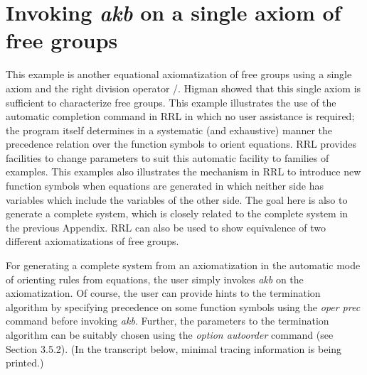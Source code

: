\chapter{Invoking {\em akb} on a single axiom of free groups}
\normalsize
\rm
This example is another equational axiomatization of free groups
using a single axiom and the right division
operator /. Higman showed that this single axiom is
sufficient to characterize free groups. This example illustrates
the use of the automatic completion command in RRL in which
no user assistance is required; the program itself determines
in a systematic (and exhaustive) manner the precedence
relation over the function symbols to orient equations. RRL
provides facilities to change parameters to suit this automatic
facility to families of examples. This examples also illustrates
the mechanism in RRL to introduce new function symbols when
equations are generated in which neither side has variables
which include the variables of the other side. The goal here is
also to generate a complete system, which is closely related
to the complete system in the previous Appendix. RRL can also
be used to show equivalence of two different axiomatizations
of free groups.

For generating a complete system from an axiomatization in the automatic
mode of orienting rules from equations, the user simply invokes
{\em akb} on the axiomatization. Of course, 
the user can provide hints to the termination algorithm
by specifying precedence on some function symbols using
the {\em oper prec} command before invoking {\em akb}. Further,
the parameters to the termination algorithm
can be suitably chosen using the {\em option autoorder} command
(see Section 3.5.2). (In the transcript below, minimal tracing
information is being printed.)

